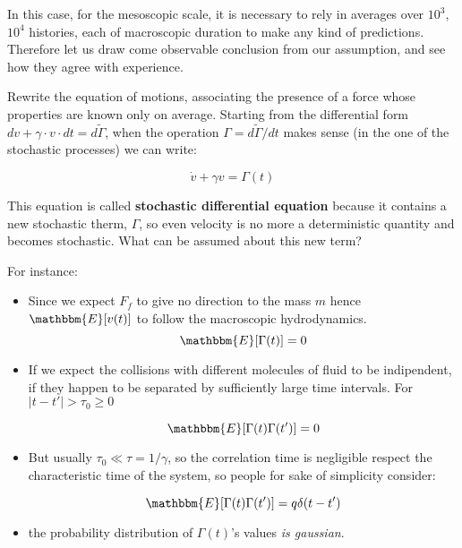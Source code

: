 \documentclass{article}
\begin{document}
In this case, for the mesoscopic scale, it is necessary to rely in averages over $10^{3}$, $10^{4}$ histories, each of macroscopic duration to make any kind of predictions. Therefore let us draw come observable conclusion from our assumption, and see how they agree with experience.
\newline

Rewrite the equation of motions, associating the presence of a force whose properties are known only on average. Starting from the differential form $ dv + \gamma \cdot v \cdot dt = d  \tilde{\Gamma} $, when the operation $ \Gamma = d \tilde{\Gamma} /{dt}$ makes sense (in the one of the stochastic processes) we can write:

\begin{equation}
\dot{v} + \gamma v = \Gamma(t) 
\end{equation}

This equation is called \textbf{stochastic differential equation} because it contains a new stochastic therm, $\Gamma$, so even velocity is no more a deterministic quantity and becomes stochastic. What can be assumed about this new term? 
\newline

For instance:

\begin{itemize}

	\item Since we expect $F_{f}$ to give no direction to the mass $m$ hence $\mathbbm{E}[v(t)]$ to follow the macroscopic hydrodynamics.
	$$\mathbbm{E}[\Gamma(t)] = 0 $$ 

	\item If we expect the collisions with different molecules of fluid to be indipendent, if they happen to be separated by sufficiently large time intervals. For $|t-t'| > \tau_{0} \geq 0 $ 

	$$ \mathbbm{E}[ \Gamma(t) \Gamma(t')] = 0 $$

	\item But usually $\tau_0 \ll \tau = 1/\gamma$, so the correlation time is negligible respect the characteristic time of the system, so people for sake of simplicity consider:

	$$  \mathbbm{E}[ \Gamma(t) \Gamma(t')] = q \delta(t-t') $$

	\item the probability distribution of $\Gamma(t)$'s values \textit{ is gaussian}.

\end{itemize}
\end{document}
